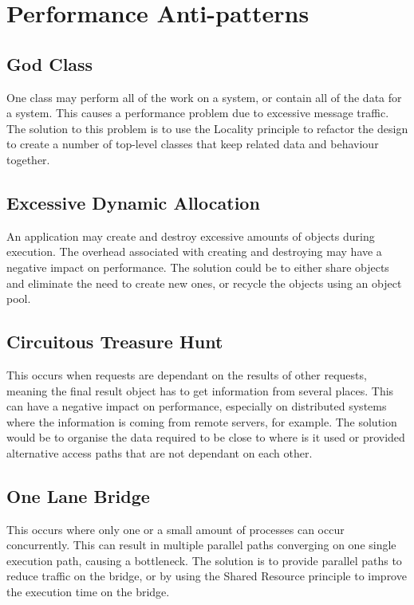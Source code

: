 \documentclass[a4paper,11pt,article,oneside]{memoir}
\begin{document}
	\section{Performance Anti-patterns}
	\subsection{God Class}
	One class may perform all of the work on a system, or contain all of the data for a system. This causes a performance problem due to excessive message    traffic. The solution to this problem is to use the Locality principle to refactor the design to create a number of top-level classes that keep related data and behaviour together.
	
	\subsection{Excessive Dynamic Allocation}
	An application may create and destroy excessive amounts of objects during execution. The overhead associated with creating and destroying may have a negative impact on performance. The solution could be to either share objects and eliminate the need to create new ones, or recycle the objects using an object pool.
	
	\subsection{Circuitous Treasure Hunt}
	This occurs when requests are dependant on the results of other requests, meaning the final result object has to get information from several places. This can have a negative impact on performance, especially on distributed systems where the information is coming from remote servers, for example. The solution would be to organise the data required to be close to where is it used or provided alternative access paths that are not dependant on each other.
	
	\subsection{One Lane Bridge}
	This occurs where only one or a small amount of processes can occur concurrently. This can result in multiple parallel paths converging on one single execution path, causing a bottleneck. The solution is to provide parallel paths to reduce traffic on the bridge, or by using the Shared Resource principle to improve the execution time on the bridge.
	
\end{document}
